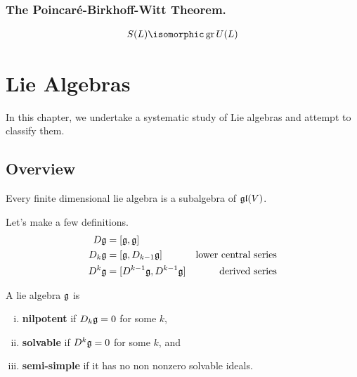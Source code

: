 \subsection{The Poincar\'e-Birkhoff-Witt Theorem.}
\label{sub:the_poincar'e_birkhoff_witt_theorem_}


\begin{theorem}
    \begin{align}
        S(L) \isomorphic \gr U(L)
    \end{align}
\end{theorem}




\chapter{Lie Algebras}
\label{cha:lie_algebras}
In this chapter, we undertake a systematic study of Lie algebras and attempt to classify them.

\section{Overview}




\begin{theorem}
Every finite dimensional lie algebra is a subalgebra of $\mathfrak{gl}(V)$.
\end{theorem}

Let's make a few definitions.
\begin{align}
    D\mathfrak{g} &= [\mathfrak{g}, \mathfrak{g}] &\text{}\\
    D_k\mathfrak{g} &= [\mathfrak{g}, D_{k-1}\mathfrak{g}] &\text{lower central series}\\
    D^k\mathfrak{g} &= [D^{k-1}\mathfrak{g}, D^{k-1}\mathfrak{g}] &\text{derived series}
\end{align}

\begin{definition} A lie algebra $\mathfrak{g}$ is 
    \begin{enumerate}[(i)]
        \makethislistcompact
        \item \textbf{nilpotent} if $D_k\mathfrak{g}=0$ for some $k$,
        \item \textbf{solvable} if $D^k\mathfrak{g}=0$ for some $k$, and
        \item \textbf{semi-simple} if it has no non nonzero solvable ideals.
    \end{enumerate}
\end{definition}

